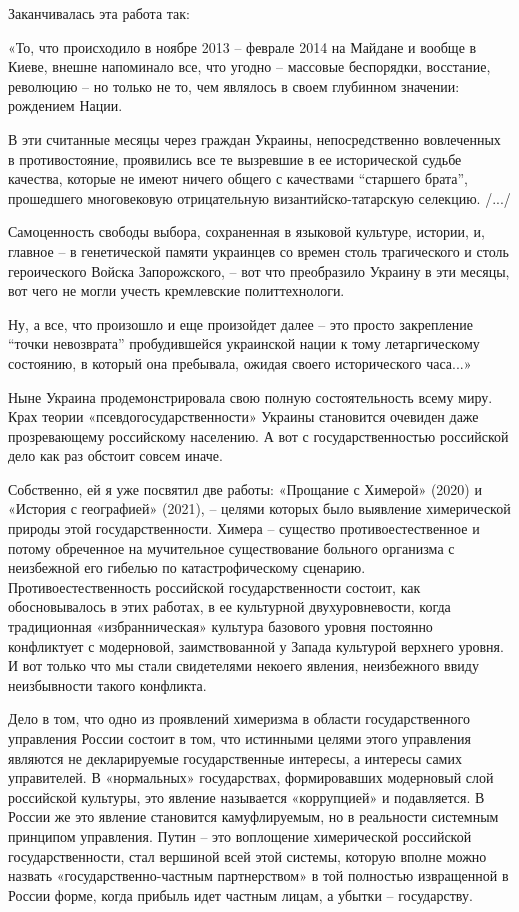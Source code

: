 \begin{itemize}
\begin{multicols}{2}
Заканчивалась эта работа так:

«То, что происходило в ноябре 2013 – феврале 2014 на Майдане и вообще в Киеве,
внешне напоминало все, что угодно – массовые беспорядки, восстание, революцию –
но только не то, чем являлось в своем глубинном значении: рождением Нации.

В эти считанные месяцы через граждан Украины, непосредственно вовлеченных в
противостояние, проявились все те вызревшие в ее исторической судьбе качества,
которые не имеют ничего общего с качествами \enquote{старшего брата}, прошедшего
многовековую отрицательную византийско-татарскую селекцию. /.../

Самоценность свободы выбора, сохраненная в языковой культуре, истории, и,
главное – в генетической памяти украинцев со времен столь трагического и столь
героического Войска Запорожского, – вот что преобразило Украину в эти месяцы,
вот чего не могли учесть кремлевские политтехнологи.

Ну, а все, что произошло и еще произойдет далее – это просто закрепление \enquote{точки
невозврата} пробудившейся украинской нации к тому летаргическому состоянию, в
который она пребывала, ожидая своего исторического часа...»

Ныне Украина продемонстрировала свою полную состоятельность всему миру. Крах
теории «псевдогосударственности» Украины становится очевиден даже прозревающему
российскому населению. А вот с государственностью российской дело как раз
обстоит совсем иначе.

Собственно, ей я уже посвятил две работы: «Прощание с Химерой» (2020) и
«История с географией» (2021), – целями которых было выявление химерической
природы этой государственности. Химера – существо противоестественное и потому
обреченное на мучительное существование больного организма с неизбежной его
гибелью по катастрофическому сценарию. Противоестественность российской
государственности состоит, как обосновывалось в этих работах, в ее культурной
двухуровневости, когда традиционная «избранническая» культура базового уровня
постоянно конфликтует с модерновой, заимствованной у Запада культурой верхнего
уровня. И вот только что мы стали свидетелями некоего явления, неизбежного
ввиду неизбывности такого конфликта.

Дело в том, что одно из проявлений химеризма в области государственного
управления России состоит в том, что истинными целями этого управления являются
не декларируемые государственные интересы, а интересы самих управителей. В
«нормальных» государствах, формировавших модерновый слой российской культуры,
это явление называется «коррупцией» и подавляется. В России же это явление
становится камуфлируемым, но в реальности системным принципом управления. Путин
– это воплощение химерической российской государственности, стал вершиной всей
этой системы, которую вполне можно назвать «государственно-частным
партнерством» в той полностью извращенной в России форме, когда прибыль идет
частным лицам, а убытки – государству.


\end{multicols}
\end{itemize}

